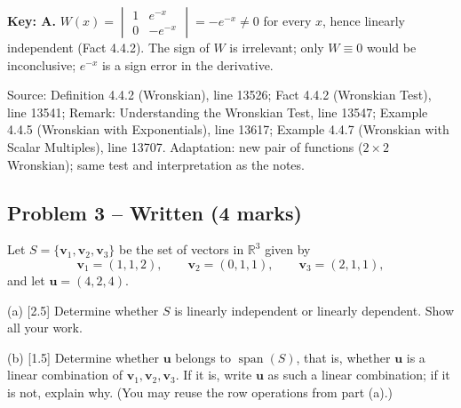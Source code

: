 \documentclass[11pt,a4paper]{article}
\newcommand{\Src}[1]{{\footnotesize\color{black!65}Source: #1}}
\begin{document}
\textbf{Key: A.} $W(x)=\begin{vmatrix}1&e^{-x}\\0&-e^{-x}\end{vmatrix}=-e^{-x}\neq0$ for every $x$, hence linearly independent (Fact 4.4.2). The sign of $W$ is irrelevant; only $W\equiv0$ would be inconclusive; $e^{-x}$ is a sign error in the derivative.\par
\Src{Definition 4.4.2 (Wronskian), line 13526; Fact 4.4.2 (Wronskian Test), line 13541; Remark: Understanding the Wronskian Test, line 13547; Example 4.4.5 (Wronskian with Exponentials), line 13617; Example 4.4.7 (Wronskian with Scalar Multiples), line 13707. Adaptation: new pair of functions ($2\times2$ Wronskian); same test and interpretation as the notes.}\par
\subsection*{Problem 3 -- Written (4 marks)}
Let $S=\{\mathbf{v}_1,\mathbf{v}_2,\mathbf{v}_3\}$ be the set of vectors in $\mathbb{R}^3$ given by\[\mathbf{v}_1=(1,1,2),\qquad \mathbf{v}_2=(0,1,1),\qquad \mathbf{v}_3=(2,1,1),\]and let $\mathbf{u}=(4,2,4)$.\par (a) [2.5] Determine whether $S$ is linearly independent or linearly dependent. Show all your work.\par (b) [1.5] Determine whether $\mathbf{u}$ belongs to $\operatorname{span}(S)$, that is, whether $\mathbf{u}$ is a linear combination of $\mathbf{v}_1,\mathbf{v}_2,\mathbf{v}_3$. If it is, write $\mathbf{u}$ as such a linear combination; if it is not, explain why. (You may reuse the row operations from part (a).)\par
\end{document}
